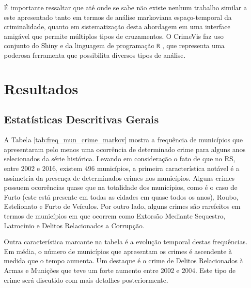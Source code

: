 \documentclass[12pt,openright,oneside,a4paper,english,french,spanish]{abntex2}
\numberwithin{table}{section} %
\numberwithin{figure}{section} %
\begin{document}
É importante ressaltar que até onde se sabe não existe nenhum trabalho similar a este apresentado tanto em termos de análise markoviana espaço-temporal da criminalidade, quanto em sistematização desta abordagem em uma interface amigável que permite múltiplos tipos de cruzamentos. O CrimeVis faz uso conjunto do Shiny e da linguagem de programação \texttt{R} \cite{softwareR}, que representa uma poderosa ferramenta que possibilita diversos tipos de análise.

\section{Resultados\label{sec:resultados_acoplamento}}

\subsection{Estatísticas Descritivas Gerais\label{sec:esta_desc_markov}}

A Tabela \ref{tab:freq_mun_crime_markov} mostra a frequência de municípios que apresentaram pelo menos uma ocorrência de determinado crime para alguns anos selecionados da série histórica. Levando em consideração o fato de que no RS, entre 2002 e 2016, existem 496 municípios, a primeira característica notável é a assimetria da presença de determinados crimes nos municípios. Alguns crimes possuem ocorrências quase que na totalidade dos municípios, como é o caso de Furto (este está presente em todas as cidades em quase todos os anos), Roubo, Estelionato e Furto de Veículos. Por outro lado, alguns crimes são rarefeitos em termos de municípios em que ocorrem como Extorsão Mediante Sequestro, Latrocínio e Delitos Relacionados a Corrupção.

Outra característica marcante na tabela é a evolução temporal destas frequências. Em média, o número de municípios que apresentam os crimes é ascendente à medida que o tempo aumenta. Um destaque é o crime de Delitos Relacionados à Armas e Munições que teve um forte aumento entre 2002 e 2004. Este tipo de crime será discutido com mais detalhes posteriormente.
\end{document}
